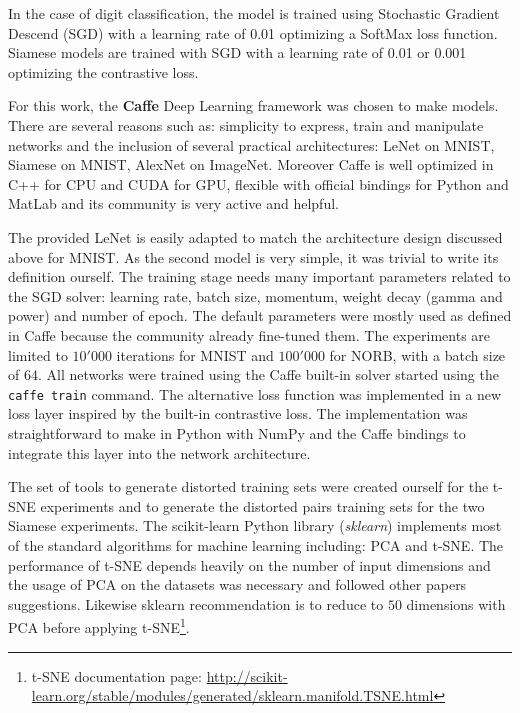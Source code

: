 \documentclass[a4paper,12pt]{report}
\begin{document}
In the case of digit classification, the model is trained using Stochastic Gradient Descend (SGD) with a learning rate of 0.01 optimizing a SoftMax loss function.
Siamese models are trained with SGD with a learning rate of 0.01 or 0.001 optimizing the contrastive loss.

For this work, the {\bf Caffe} Deep Learning framework was chosen to make models.
There are several reasons such as: simplicity to express, train and manipulate networks and the inclusion of several practical architectures: LeNet on MNIST, Siamese on MNIST, AlexNet on ImageNet.
Moreover Caffe is well optimized in C++ for CPU and CUDA for GPU, flexible with official bindings for Python and MatLab and its community is very active and helpful.

The provided LeNet is easily adapted to match the architecture design discussed above for MNIST.
As the second model is very simple, it was trivial to write its definition ourself.
The training stage needs many important parameters related to the SGD solver: learning rate, batch size, momentum, weight decay (gamma and power) and number of epoch.
The default parameters were mostly used as defined in Caffe because the community already fine-tuned them.
The experiments are limited to $10'000$ iterations for MNIST and $100'000$ for NORB, with a batch size of $64$.
All networks were trained using the Caffe built-in solver started using the {\tt caffe train} command.
The alternative loss function was implemented in a new loss layer inspired by the built-in contrastive loss.
The implementation was straightforward to make in Python with NumPy and the Caffe bindings to integrate this layer into the network architecture.

The set of tools to generate distorted training sets were created ourself for the t-SNE experiments and to generate the distorted pairs training sets for the two Siamese experiments.
The scikit-learn Python library ({\em sklearn}) implements most of the standard algorithms for machine learning including: PCA and t-SNE\cite{pedregosa2011scikit}.
The performance of t-SNE depends heavily on the number of input dimensions and the usage of PCA on the datasets was necessary and followed other papers suggestions\cite{t-SNE}.
Likewise sklearn recommendation is to reduce to $50$ dimensions with PCA before applying t-SNE\footnote{t-SNE documentation page: \url{http://scikit-learn.org/stable/modules/generated/sklearn.manifold.TSNE.html}}.
\end{document}
